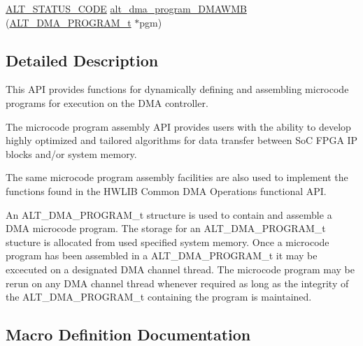 \begin{DoxyCompactItemize}
\item 
\mbox{\hyperlink{hwlib_8h_abdb0d369f069723ca55d6c94bcaaaa12}{A\+L\+T\+\_\+\+S\+T\+A\+T\+U\+S\+\_\+\+C\+O\+DE}} \mbox{\hyperlink{group__ALT__DMA__PRG_gac6152eddee399ef5962782ae350a5317}{alt\+\_\+dma\+\_\+program\+\_\+\+D\+M\+A\+W\+MB}} (\mbox{\hyperlink{group__ALT__DMA__PRG_gadb7028531574894854db4db6d797de97}{A\+L\+T\+\_\+\+D\+M\+A\+\_\+\+P\+R\+O\+G\+R\+A\+M\+\_\+t}} $\ast$pgm)
\end{DoxyCompactItemize}


\subsection{Detailed Description}
This A\+PI provides functions for dynamically defining and assembling microcode programs for execution on the D\+MA controller.

The microcode program assembly A\+PI provides users with the ability to develop highly optimized and tailored algorithms for data transfer between SoC F\+P\+GA IP blocks and/or system memory.

The same microcode program assembly facilities are also used to implement the functions found in the H\+W\+L\+IB Common D\+MA Operations functional A\+PI.

An A\+L\+T\+\_\+\+D\+M\+A\+\_\+\+P\+R\+O\+G\+R\+A\+M\+\_\+t structure is used to contain and assemble a D\+MA microcode program. The storage for an A\+L\+T\+\_\+\+D\+M\+A\+\_\+\+P\+R\+O\+G\+R\+A\+M\+\_\+t stucture is allocated from used specified system memory. Once a microcode program has been assembled in a A\+L\+T\+\_\+\+D\+M\+A\+\_\+\+P\+R\+O\+G\+R\+A\+M\+\_\+t it may be excecuted on a designated D\+MA channel thread. The microcode program may be rerun on any D\+MA channel thread whenever required as long as the integrity of the A\+L\+T\+\_\+\+D\+M\+A\+\_\+\+P\+R\+O\+G\+R\+A\+M\+\_\+t containing the program is maintained. 

\subsection{Macro Definition Documentation}
\mbox{\label{group__ALT__DMA__PRG_gab1f145c6cd73c64707ef47ba15550b3b}} 
